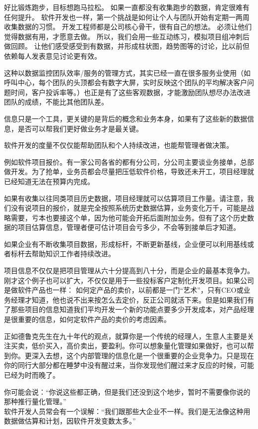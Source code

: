 好比锻炼跑步，目标想跑马拉松。
如果一直都没有收集跑步的数据，肯定很难有任何提升。
软件开发也一样，第一个挑战是如何让个人与团队开始有定期一两周收集数据的习惯。
开发工程师都是公司核心骨干，很有自己的想法。
必须让他们觉得数据有用，才愿意去做。
所以，我们会用一些互动练习，模拟项目组冲刺后做回顾。
让他们感受感受到有数据，并形成柱状图，趋势图等的讨论，比以前但依赖每人发表意见讨论更有效。

这种以数据监控团队效率/服务的管理方式，其实已经一直在很多服务业使用（如呼叫中心，每个团队的头顶都会有数字大屏，实时反映这个团队的平均解决客户问题时间，客户投诉率等。）也正是有了这些客观数据，才能激励团队想尽办法改进团队的成绩，不能比其他团队差。

信息只是一个工具，更关键的是背后的概念和业务本身，如果有了这些新的数据信息，是否可以帮我们更好做业务才是最关键。

软件开发的度量不仅仅能帮助团队和个人持续改进，也能帮管理者做决策。

例如软件项目报价。有一家公司各省的都有分公司，分公司主要谈业务接单，总部做开发。为了抢单，业务员都会尽量把压低软件价格，导致还未开工，项目经理就已经知道无法在预算内完成。

如果有收集以往同类项目历史数据，项目经理就可以估算项目工作量。请注意，我们没有说项目的报价，就是完全按照系统历史数据估算，业务变化万千，可能是战略需要，亏本也要接这个单，因为他可能会开拓后面附加业务。但有了这个历史数据的项目估算信息，管理者便可估计项目会亏多少，不会等到接单后才知道。

如果企业有不断收集项目数据，形成标杆，不断更新基线，企业便可以利用基线或者标杆去帮助知识工作者持续改进。

项目信息不仅仅是把项目管理从六十分提高到八十分，而是企业的最基本竞争力。刚才这个例子也可以扩大，不仅仅是用于一些投标客户定制化开发项目。如果公司是做软件产品也一样：
如何定产品的卖价，以前都是一门``艺术''，只有CEO或业务经理才知道，他也说不出来按怎么去定价，反正公司就活下来。但是如果我们有了那些项目的信息知道我们平均开发一个新的功能点要多少开发成本，对产品经理是很重要的信息，如何定软件产品的卖价的考虑因素。

正如德鲁克先生在九十年代的观点，就算你是一个传统的经理人，生意人主要是关注买卖，低价买入，高价卖出，要盈利。你可以想象量化管理如果做好，也可以帮到你。更深入去想，这个内部管理的信息化是一个很重要的企业竞争力。只是现在你的同行大部分都在睡梦中没有醒过来，当你发现他们醒过来才反应的时候，可能已经为时而晚了。

你可能会说：``你说这些都正确，但是我们还没到这个地步，暂时不需要像你说的那种推行量化管理。''\\
软件开发人员常会有一个误解：``我们跟那些大企业不一样。我们是无法像这种用数据做估算和计划，因软件开发变数太多。''\\


